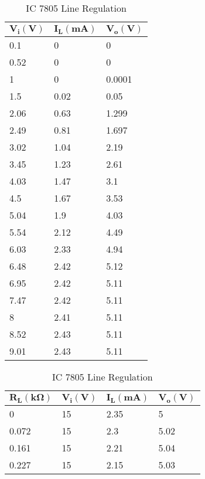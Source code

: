 \documentclass{scrartcl}
\newcommand{\1}{\mathbbm{1}}
\begin{document}
\begin{table}[!htb]
	\centering
    \begin{minipage}{.35\linewidth}
		\centering
    \begin{tabular}{|l|l|l|}
    \hline
        $\pmb{V_i (V)}$ & $\pmb{I_L (mA)}$ & $\pmb{V_o (V)}$ \\ \hline
        0.1 & 0 & 0 \\ \hline
        0.52 & 0 & 0 \\ \hline
        1 & 0 & 0.0001 \\ \hline
        1.5 & 0.02 & 0.05 \\ \hline
        2.06 & 0.63 & 1.299 \\ \hline
        2.49 & 0.81 & 1.697 \\ \hline
        3.02 & 1.04 & 2.19 \\ \hline
        3.45 & 1.23 & 2.61 \\ \hline
        4.03 & 1.47 & 3.1 \\ \hline
        4.5 & 1.67 & 3.53 \\ \hline
        5.04 & 1.9 & 4.03 \\ \hline
        5.54 & 2.12 & 4.49 \\ \hline
        6.03 & 2.33 & 4.94 \\ \hline
        6.48 & 2.42 & 5.12 \\ \hline
        6.95 & 2.42 & 5.11 \\ \hline
        7.47 & 2.42 & 5.11 \\ \hline
        8 & 2.41 & 5.11 \\ \hline
        8.52 & 2.43 & 5.11 \\ \hline
        9.01 & 2.43 & 5.11 \\ \hline
    \end{tabular}
    \caption{IC 7805 Line Regulation}
	\label{tab:icline}
    \end{minipage}%
    \begin{minipage}{.45\linewidth}
		\centering
    \begin{tabular}{|l|l|l|l|}
    \hline
        $\pmb{R_L (k \Omega)}$ & $\pmb{V_i (V)}$ & $\pmb{I_L (mA)}$ & $\pmb{V_o (V)}$ \\ \hline
        0 & 15 & 2.35 & 5 \\ \hline
        0.072 & 15 & 2.3 & 5.02 \\ \hline
        0.161 & 15 & 2.21 & 5.04 \\ \hline
        0.227 & 15 & 2.15 & 5.03 \\ \hline

\end{tabular}
\end{minipage}
\end{table}
\end{document}
